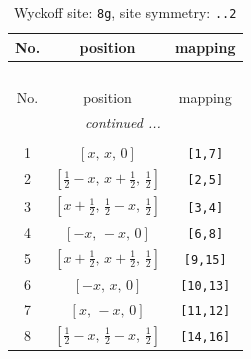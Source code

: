 \documentclass[fleqn,8pt]{jsarticle}
\begin{document}
\renewcommand{\arraystretch}{1.2}
\begin{longtable}{ccc}
\caption{Wyckoff site: {\tt 8g}, site symmetry: {\tt ..2}}
 \\
 \hline \hline
No. & position & mapping \\ \hline \endfirsthead

\multicolumn{2}{l}{\tablename\ \thetable{}} \\
 \hline \hline
No. & position & mapping \\ \hline \endhead

 \hline \hline
\multicolumn{2}{r}{\footnotesize\it continued ...} \\ \endfoot

 \hline \hline
\multicolumn{2}{r}{} \\ \endlastfoot

1 & $\left[ x,\, x,\, 0 \right]$ & {\tt [1,7]} \\ \hline
2 & $\left[ \frac{1}{2} - x,\, x + \frac{1}{2},\, \frac{1}{2} \right]$ & {\tt [2,5]} \\ \hline
3 & $\left[ x + \frac{1}{2},\, \frac{1}{2} - x,\, \frac{1}{2} \right]$ & {\tt [3,4]} \\ \hline
4 & $\left[ - x,\, - x,\, 0 \right]$ & {\tt [6,8]} \\ \hline
5 & $\left[ x + \frac{1}{2},\, x + \frac{1}{2},\, \frac{1}{2} \right]$ & {\tt [9,15]} \\ \hline
6 & $\left[ - x,\, x,\, 0 \right]$ & {\tt [10,13]} \\ \hline
7 & $\left[ x,\, - x,\, 0 \right]$ & {\tt [11,12]} \\ \hline
8 & $\left[ \frac{1}{2} - x,\, \frac{1}{2} - x,\, \frac{1}{2} \right]$ & {\tt [14,16]} \\
\end{longtable}
\renewcommand{\arraystretch}{1.2}
\end{document}
